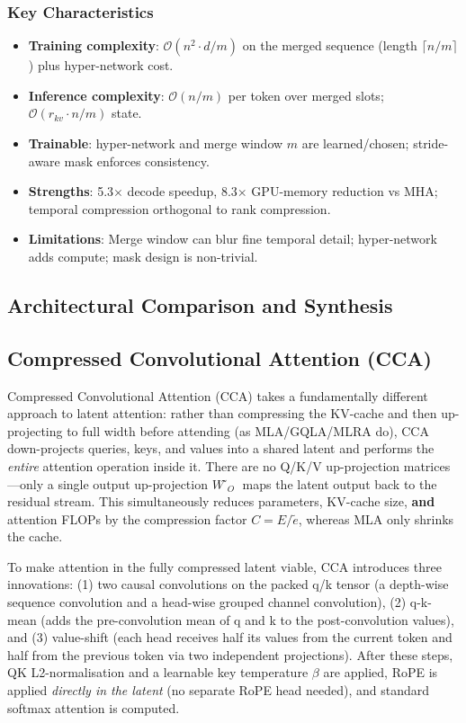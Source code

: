 \subsubsection{Key Characteristics}
\begin{itemize}[leftmargin=*]
    \item \textbf{Training complexity}: $\mathcal{O}(n^2 \cdot d / m)$ on the merged sequence (length $\lceil n/m \rceil$) plus hyper-network cost.
    \item \textbf{Inference complexity}: $\mathcal{O}(n/m)$ per token over merged slots; $\mathcal{O}(r_{kv} \cdot n / m)$ state.
    \item \textbf{Trainable}: hyper-network and merge window $m$ are learned/chosen; stride-aware mask enforces consistency.
    \item \textbf{Strengths}: 5.3$\times$ decode speedup, 8.3$\times$ GPU-memory reduction vs MHA; temporal compression orthogonal to rank compression.
    \item \textbf{Limitations}: Merge window can blur fine temporal detail; hyper-network adds compute; mask design is non-trivial.
\end{itemize}

\subsection{Architectural Comparison and Synthesis}

\subsection{Compressed Convolutional Attention (CCA)}
Compressed Convolutional Attention (CCA) \citep{figliola_cca_2025} takes a fundamentally different approach to latent attention: rather than compressing the KV-cache and then up-projecting to full width before attending (as MLA/GQLA/MLRA do), CCA down-projects queries, keys, and values into a shared latent and performs the \emph{entire} attention operation inside it. There are no Q/K/V up-projection matrices---only a single output up-projection $W̃_O$ maps the latent output back to the residual stream. This simultaneously reduces parameters, KV-cache size, \textbf{and} attention FLOPs by the compression factor $C = E/\tilde{e}$, whereas MLA only shrinks the cache.

To make attention in the fully compressed latent viable, CCA introduces three innovations: (1) two causal convolutions on the packed q/k tensor (a depth-wise sequence convolution and a head-wise grouped channel convolution), (2) q-k-mean (adds the pre-convolution mean of q and k to the post-convolution values), and (3) value-shift (each head receives half its values from the current token and half from the previous token via two independent projections). After these steps, QK L2-normalisation and a learnable key temperature $\beta$ are applied, RoPE is applied \emph{directly in the latent} (no separate RoPE head needed), and standard softmax attention is computed.

